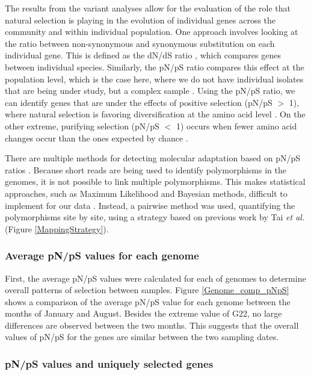 The results from the variant analyses allow for the evaluation of the role that natural selection is playing in the evolution of individual genes across the community and within individual population. One approach involves looking at the ratio between non-synonymous and synonymous substitution on each individual gene. This is defined as the dN/dS ratio \cite{McDonald:1991hj}, which compares genes between individual species. Similarly, the pN/pS ratio compares this effect at the population level, which is the case here, where we do not have individual isolates that are being under study, but a complex sample \cite{Egea:2008jo,Schloissnig:2012hx}. Using the pN/pS ratio, we can identify genes that are under the effects of positive selection (pN/pS $>$ 1), where natural selection is favoring diversification at the amino acid level \cite{Hurst:2002ht}. On the other extreme, purifying selection (pN/pS $<$ 1) occurs when fewer amino acid changes occur than the ones expected by chance \cite{Hurst:2002ht}.

There are multiple methods for detecting molecular adaptation based on pN/pS ratios \cite{Yang:2000hh}. Because short reads are being used to identify polymorphisms in the genomes, it is not possible to link multiple polymorphisms. This makes statistical approaches, such as Maximum Likelihood and Bayesian methods, difficult to implement for our data \cite{Yang:2000hh}. Instead, a pairwise method was used, quantifying the polymorphisms site by site, using a strategy based on previous work by Tai \textit{et al.} \cite{Tai:2011jo} (Figure \ref{MappingStrategy}). 

\subsubsection{Average pN/pS values for each genome}

First, the average pN/pS values were calculated for each of genomes to determine overall patterns of selection between samples. Figure \ref{Genome_comp_pNpS} shows a comparison of the average pN/pS value for each genome between the months of January and August. Besides the extreme value of G22, no large differences are observed between the two months. This suggests that the overall values of pN/pS for the genes are similar between the two sampling dates.


\subsubsection{pN/pS values and uniquely selected genes}

